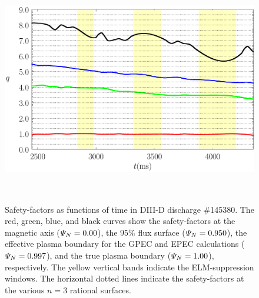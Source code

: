 \documentclass[12pt,prb,aps]{revtex4-1}
\begin{document}
\begin{figure}
\includegraphics[height=4in]{fig4.pdf}
\caption{Safety-factors as functions of time in  DIII-D discharge \#145380. The red, green, blue, and black curves show the safety-factors
at the magnetic axis (${\mit\Psi}_N=0.00$),
the $95\%$ flux surface (${\mit\Psi}_N=0.950$), the
effective plasma boundary for the GPEC and EPEC calculations
(${\mit\Psi}_N=0.997$), and the true plasma boundary (${\mit\Psi}_N=1.00$), respectively. The yellow vertical bands indicate the ELM-suppression windows. 
The horizontal dotted lines indicate the safety-factors at the various $n=3$ rational surfaces.} \label{fig4}
\end{figure}
\end{document}

